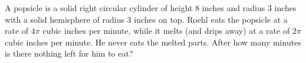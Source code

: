 A popsicle is a solid right circular cylinder of height $8$ inches and radius $3$ inches with a solid hemisphere of radius $3$ inches on top. Roehl eats the popsicle at a rate of $4\pi$ cubic inches per minute, while it melts (and drips away) at a rate of $2\pi$ cubic inches per minute. He never eats the melted parts. After how many minutes is there nothing left for him to eat?
